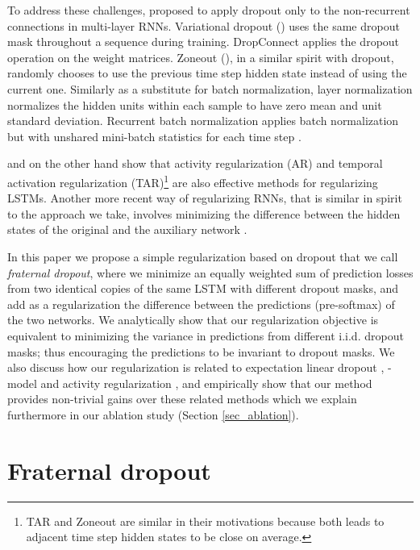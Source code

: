 \documentclass{article} \usepackage{iclr2018_conference,times}
\begin{document}
To address these challenges, \citet{zaremba2014recurrent} proposed to apply dropout only to the non-recurrent connections in multi-layer RNNs. Variational dropout (\cite{vdropout}) uses the same dropout mask throughout a sequence during training. DropConnect \citep{wan2013regularization} applies the dropout operation on the weight matrices. Zoneout (\cite{zoneout}), in a similar spirit with dropout, randomly chooses to use the previous time step hidden state instead of using the current one. Similarly as a substitute for batch normalization, layer normalization normalizes the hidden units within each sample to have zero mean and unit standard deviation. Recurrent batch normalization applies batch normalization but with unshared mini-batch statistics for each time step \citep{DBLP:journals/corr/CooijmansBLC16}.

\citet{merity2017regularizing} and \citet{ar_tar} on the other hand show that activity regularization (AR) and temporal activation regularization (TAR)\footnote{TAR and Zoneout are similar in their motivations because both leads to adjacent time step hidden states to be close on average.} are also effective methods for regularizing LSTMs. Another more recent way of regularizing RNNs, that is similar in spirit to the approach we take, involves minimizing the difference between the hidden states of the original and the auxiliary network \cite{serdyuk2017twinnet}.

In this paper we propose a simple regularization based on dropout that we call \emph{fraternal dropout}, where we minimize an equally weighted sum of prediction losses from two identical copies of the same LSTM with different dropout masks, and add as a regularization the  difference between the predictions (pre-softmax) of the two networks. We analytically show that our regularization objective is equivalent to minimizing the variance in predictions from different i.i.d. dropout masks; thus encouraging the predictions to be invariant to dropout masks. We also discuss how our regularization is related to expectation linear dropout \cite{ma2016dropout}, -model \cite{laine2016temporal} and activity regularization \cite{ar_tar}, and empirically show that our method provides non-trivial gains over these related methods which we explain furthermore in our ablation study (Section \ref{sec_ablation}). 

\section{Fraternal dropout}
\label{sec_fd}
\end{document}

